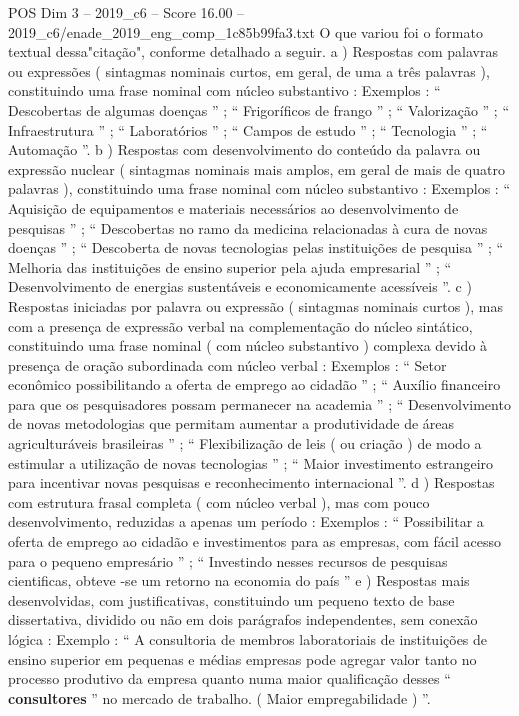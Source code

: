 \begin{textsample}{POS Dim 3 – 2019\_c6 – Score 16.00 – 2019\_c6/enade\_2019\_eng\_comp\_1c85b99fa3.txt}
O que variou foi o formato textual dessa"citação", conforme detalhado a seguir. a ) Respostas com palavras ou expressões ( sintagmas nominais curtos, em geral, de uma a três palavras ), constituindo uma frase nominal com núcleo substantivo : Exemplos : “ Descobertas de algumas doenças ” ; “ Frigoríficos de frango ” ; “ Valorização ” ; “ Infraestrutura ” ; “ Laboratórios ” ; “ Campos de estudo ” ; “ Tecnologia ” ; “ Automação ”. b ) Respostas com desenvolvimento do conteúdo da palavra ou expressão nuclear ( sintagmas nominais mais amplos, em geral de mais de quatro palavras ), constituindo uma frase nominal com núcleo substantivo : Exemplos : “ Aquisição de equipamentos e materiais necessários ao desenvolvimento de pesquisas ” ; “ Descobertas no ramo da medicina relacionadas à cura de novas doenças ” ; “ Descoberta de novas tecnologias pelas instituições de pesquisa ” ; “ Melhoria das instituições de ensino superior pela ajuda empresarial ” ; “ Desenvolvimento de energias sustentáveis e economicamente acessíveis ”. c ) Respostas iniciadas por palavra ou expressão ( sintagmas nominais curtos ), mas com a presença de expressão verbal na complementação do núcleo sintático, constituindo uma frase nominal ( com núcleo substantivo ) complexa devido à presença de oração subordinada com núcleo verbal : Exemplos : “ Setor econômico possibilitando a oferta de emprego ao cidadão ” ; “ Auxílio financeiro para que os pesquisadores possam permanecer na academia ” ; “ Desenvolvimento de novas metodologias que permitam aumentar a produtividade de áreas agriculturáveis brasileiras ” ; “ Flexibilização de leis ( ou criação ) de modo a estimular a utilização de novas tecnologias ” ; “ Maior investimento estrangeiro para incentivar novas pesquisas e reconhecimento internacional ”. d ) Respostas com estrutura frasal completa ( com núcleo verbal ), mas com pouco desenvolvimento, reduzidas a apenas um período : Exemplos : “ Possibilitar a oferta de emprego ao cidadão e investimentos para as empresas, com fácil acesso para o pequeno empresário ” ; “ Investindo nesses recursos de pesquisas cientificas, obteve -se um retorno na economia do país ” e ) Respostas mais desenvolvidas, com justificativas, constituindo um pequeno texto de base dissertativa, dividido ou não em dois parágrafos independentes, sem conexão lógica : Exemplo : “ A consultoria de membros laboratoriais de instituições de ensino superior em pequenas e médias empresas pode agregar valor tanto no processo produtivo da empresa quanto numa maior qualificação desses “ \textbf{consultores} ” no mercado de trabalho. ( Maior empregabilidade ) ”.

\end{textsample}
